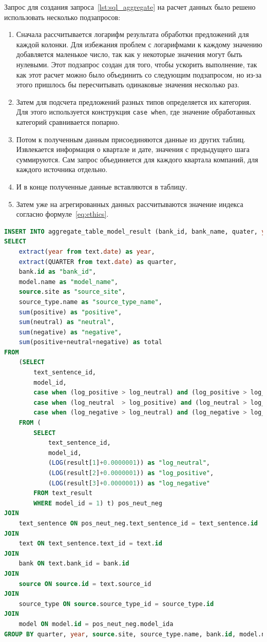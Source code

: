 \documentclass[PI, VKR]{HSEUniversity}
\begin{document}
Запрос для создания запроса~\ref{lst:sql_aggregate} на расчет данных было решено использовать несколько подзапросов:
\begin{enumerate}
\item Сначала рассчитывается логарифм результата обработки предложений для каждой колонки. Для избежания проблем с логарифмами к каждому значению добавляется маленькое число, так как у некоторые значения могут быть нулевыми. Этот подзапрос создан для того, чтобы ускорить выполнение, так как этот расчет можно было объединить со следующим подзапросом, но из-за этого пришлось бы пересчитывать одинаковые значения несколько раз.
\item Затем для подсчета предложений разных типов определяется их категория. Для этого используется конструкция \texttt{case when}, где значение обработанных категорий сравнивается попарно.
\item Потом к полученным данным присоединяются данные из других таблиц. Извлекается информация о квартале и дате, значения с предыдущего шага суммируются. Сам запрос объединяется для каждого квартала компаний, для каждого источника отдельно.
\item И в конце полученные данные вставляются в таблицу.
\item Затем уже на агрегированных данных рассчитываются значение индекса согласно формуле~\ref{eq:ethics}.
\end{enumerate}

\begin{lstlisting}[language=SQL,label=lst:sql_aggregate,caption={SQL запрос на агрегацию обработанных предложений},captionpos=b,numbers=none]
INSERT INTO aggregate_table_model_result (bank_id, bank_name, quater, year, model_name, source_site, source_type, positive, neutral, negative, total)
SELECT
    extract(year from text.date) as year,
    extract(QUARTER from text.date) as quarter,
    bank.id as "bank_id",
    model.name as "model_name",
    source.site as "source_site",
    source_type.name as "source_type_name",
    sum(positive) as "positive",
    sum(neutral) as "neutral",
    sum(negative) as "negative",
    sum(positive+neutral+negative) as total
FROM
    (SELECT
        text_sentence_id,
        model_id,
        case when (log_positive > log_neutral) and (log_positive > log_negative) then 1 else 0 end as "positive",
        case when (log_neutral  > log_positive) and (log_neutral > log_negative) then 1 else 0 end as "neutral",
        case when (log_negative > log_neutral) and (log_negative > log_positive) then 1 else 0 end as "negative"
    FROM (
        SELECT
            text_sentence_id,
            model_id,
            (LOG(result[1]+0.0000001)) as "log_neutral",
            (LOG(result[2]+0.0000001)) as "log_positive",
            (LOG(result[3]+0.0000001)) as "log_negative"
        FROM text_result
        WHERE model_id = 1) t) pos_neut_neg
JOIN
    text_sentence ON pos_neut_neg.text_sentence_id = text_sentence.id
JOIN
    text ON text_sentence.text_id = text.id
JOIN
    bank ON text.bank_id = bank.id
JOIN
    source ON source.id = text.source_id
JOIN
    source_type ON source.source_type_id = source_type.id
JOIN
    model ON model.id = pos_neut_neg.model_ida
GROUP BY quarter, year, source.site, source_type.name, bank.id, model.name
\end{lstlisting}
\end{document}
